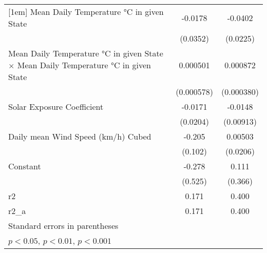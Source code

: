{\begin{tabular}{l*{2}{c}}
[1em]
Mean Daily Temperature °C in given State&     -0.0178         &     -0.0402         \\
                    &    (0.0352)         &    (0.0225)         \\
[1em]
Mean Daily Temperature °C in given State $\times$ Mean Daily Temperature °C in given State&    0.000501         &    0.000872         \\
                    &  (0.000578)         &  (0.000380)         \\
[1em]
Solar Exposure Coefficient&     -0.0171         &     -0.0148         \\
                    &    (0.0204)         &   (0.00913)         \\
[1em]
Daily mean Wind Speed (km/h) Cubed&      -0.205         &     0.00503         \\
                    &     (0.102)         &    (0.0206)         \\
[1em]
Constant            &      -0.278         &       0.111         \\
                    &     (0.525)         &     (0.366)         \\
\hline
r2                  &       0.171         &       0.400         \\
r2\_a                &       0.171         &       0.400         \\
\hline\hline
\multicolumn{3}{l}{\footnotesize Standard errors in parentheses}\\
\multicolumn{3}{l}{\footnotesize \sym{*} \(p<0.05\), \sym{**} \(p<0.01\), \sym{***} \(p<0.001\)}\\
\end{tabular}
}

